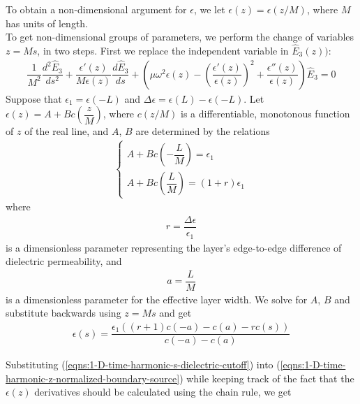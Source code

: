 \documentclass[12pt,twoside]{article}
\begin{document}
To obtain a non-dimensional argument for $\epsilon$, we let $\epsilon(z) = \epsilon(z/M)$, where $M$ has units of length. \\
To get non-dimensional groups of parameters, we perform the change of variables $z=M s$, in two steps. First we replace the independent variable in $\hat{E}_3(z))$:
\begin{align}
\label{eqns:1-D-time-harmonic-z-normalized-boundary-source}
\dfrac{1}{M^2}\dfrac{d^2 \hat{E}_3}{d s^2} + 
\dfrac{\epsilon'(z)}{M \epsilon(z)}\dfrac{d \hat{E}_3}{d s} + 
\left( \mu \omega^2\epsilon(z)-\left(\dfrac{\epsilon'(z)}{\epsilon(z)}\right)^2 + \dfrac{\epsilon''(z)}{\epsilon(z)}\right)\hat{E}_3 = 0 
\end{align}
Suppose that $\epsilon_1 = \epsilon(-L)$ and $\Delta \epsilon = \epsilon(L)-\epsilon(-L)$. Let $\epsilon(z) = A+Bc\left( \dfrac{z}{M}\right)$, where $c(z/M)$ is a differentiable, monotonous function of $z$ of the real line, and  $A$, $B$ are determined by the relations
\begin{align*}
\begin{cases}
A + Bc\left( -\dfrac{L}{M}\right) = \epsilon_1	\\
A + Bc\left( \dfrac{L}{M}\right) = (1+ r)\epsilon_1
\end{cases}
\end{align*}
where
\begin{align}
r = \dfrac{\Delta \epsilon}{\epsilon_1} 
\end{align} 
is a dimensionless parameter representing the layer's edge-to-edge difference of dielectric permeability, and
\begin{align}
a = \dfrac{L}{M}
\end{align} 
is a dimensionless parameter for the effective layer width. We solve
for $A$, $B$ and substitute backwards using $z = M s$ and get
\begin{align}
\label{eqns:1-D-time-harmonic-s-dielectric-cutoff}
\epsilon(s) = \dfrac{\epsilon_1 ((r+1) c(-a)-c(a)-r c(s))}{c(-a)-c(a)}
\end{align}

Substituting (\ref{eqns:1-D-time-harmonic-s-dielectric-cutoff}) into (\ref{eqns:1-D-time-harmonic-z-normalized-boundary-source}) while keeping track of the fact that the $\epsilon(z)$ derivatives should be calculated using the chain rule, we get
\end{document}
